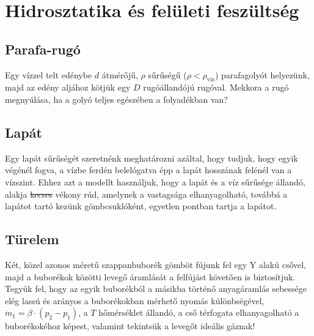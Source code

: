 \documentclass[12pt,a4paper]{scrartcl}
\begin{document}
\section{Hidrosztatika és felületi feszültség}
\subsection{Parafa-rugó}
Egy vízzel telt edénybe $d$ átmérőjű, $\rho$ sűrűségű ($\rho<\rho_{\text{víz}}$) parafagolyót helyezünk, majd az edény aljához kötjük egy $D$ rugóállandójú rugóval. Mekkora a rugó megnyúlása, ha a golyó teljes egészében a folyadékban van?


\subsection{Lapát}
Egy lapát sűrűségét szeretnénk meghatározni azáltal, hogy tudjuk, hogy egyik végénél fogva, a vízbe ferdén belelógatva épp a lapát hosszának felénél van a vízszint. Ehhez azt a modellt használjuk, hogy a lapát és a víz sűrűsége állandó, alakja \sout{kecses} vékony rúd, amelynek a vastagsága elhanyagolható, továbbá a lapátot tartó kezünk gömbcsuklóként, egyetlen pontban tartja a lapátot.

\subsection{Türelem}
Két, közel azonos méretű szappanbuborék gömböt fújunk fel egy Y alakú csővel, majd a buborékok közötti levegő áramlását a felfújást követően is biztosítjuk. Tegyük fel, hogy az egyik buborékból a másikba történő anyagáramlás sebessége elég lassú és arányos a buborékokban mérhető nyomás különbségével, ${\dot m_1} = \beta  \cdot \left( {{p_2} - {p_1}} \right)$, a $T$ hőmérséklet állandó, a cső térfogata elhanyagolható a buborékokéhoz képest, valamint tekintsük a levegőt ideális gáznak! 
\end{document}
